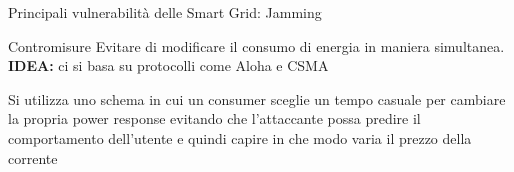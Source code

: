 \begin{frame}{Principali vulnerabilità delle Smart Grid: Jamming}
	\begin{block}{Contromisure}
		Evitare di modificare il consumo di energia in maniera simultanea.\newline
		\textbf{\color{blue_slides}IDEA: } ci si basa su protocolli come Aloha e CSMA
	\end{block}
	\pause
	\begin{block}{}
	Si utilizza uno schema in cui un consumer sceglie un tempo casuale per cambiare la propria power response evitando che l'attaccante possa predire il comportamento dell'utente e quindi capire in che modo varia il prezzo della corrente
	\end{block}
\end{frame}